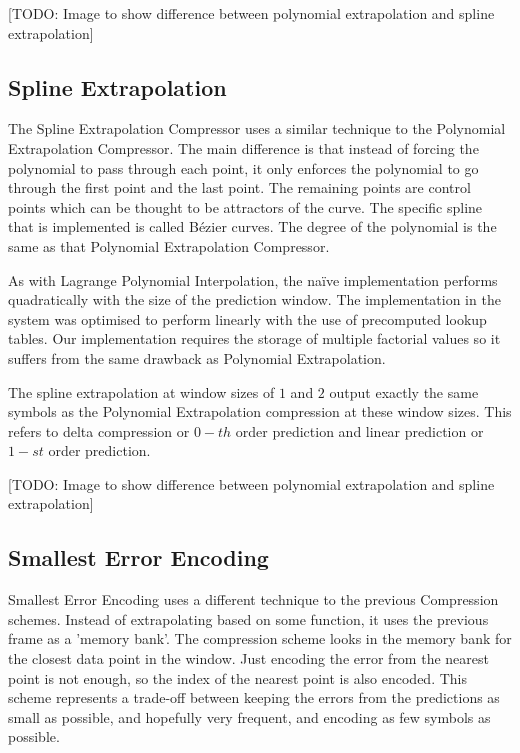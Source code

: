\documentclass[a4paper,11pt]{report}
\begin{document}
[TODO: Image to show difference between polynomial extrapolation and spline extrapolation]

\subsection{Spline Extrapolation}

The Spline Extrapolation Compressor uses a similar technique to the Polynomial Extrapolation Compressor. The main difference is that instead of forcing the polynomial to pass through each point, it only enforces the polynomial to go through the first point and the last point. The remaining points are control points which can be thought to be attractors of the curve. The specific spline that is implemented is called B\'ezier curves. The degree of the polynomial is the same as that Polynomial Extrapolation Compressor.

As with Lagrange Polynomial Interpolation, the na\"ive implementation performs quadratically with the size of the prediction window. The implementation in the system was optimised to perform linearly with the use of precomputed lookup tables. Our implementation requires the storage of multiple factorial values so it suffers from the same drawback as Polynomial Extrapolation.

The spline extrapolation at window sizes of $1$ and $2$ output exactly the same symbols as the Polynomial Extrapolation compression at these window sizes. This refers to delta compression or $0-th$ order prediction and linear prediction or $1-st$ order prediction.  

[TODO: Image to show difference between polynomial extrapolation and spline extrapolation]

\subsection{Smallest Error Encoding}

Smallest Error Encoding uses a different technique to the previous Compression schemes. Instead of extrapolating based on some function, it uses the previous frame as a 'memory bank'. The compression scheme looks in the memory bank for the closest data point in the window. Just encoding the error from the nearest point is not enough, so the index of the nearest point is also encoded. This scheme represents a trade-off between keeping the errors from the predictions as small as possible, and hopefully very frequent, and encoding as few symbols as possible.
\end{document}
